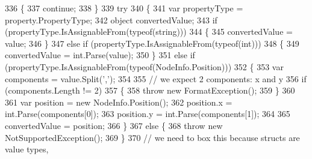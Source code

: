 \begin{DoxyCode}
336                                     \{
337                                         \textcolor{keywordflow}{continue};
338                                     \}
339                                     \textcolor{keywordflow}{try}
340                                     \{
341                                         var propertyType = property.PropertyType;
342                                         \textcolor{keywordtype}{object} convertedValue;
343                                         \textcolor{keywordflow}{if} (propertyType.IsAssignableFrom(typeof(\textcolor{keywordtype}{string})))
344                                         \{
345                                             convertedValue = value;
346                                         \}
347                                         \textcolor{keywordflow}{else} \textcolor{keywordflow}{if} (propertyType.IsAssignableFrom(typeof(\textcolor{keywordtype}{int})))
348                                         \{
349                                             convertedValue = int.Parse(value);
350                                         \}
351                                         \textcolor{keywordflow}{else} \textcolor{keywordflow}{if} (propertyType.IsAssignableFrom(typeof(NodeInfo.Position)))
352                                         \{
353                                             var components = value.Split(\textcolor{charliteral}{','});
354 
355                                             \textcolor{comment}{// we expect 2 components: x and y}
356                                             \textcolor{keywordflow}{if} (components.Length != 2)
357                                             \{
358                                                 \textcolor{keywordflow}{throw} \textcolor{keyword}{new} FormatException();
359                                             \}
360 
361                                             var position = \textcolor{keyword}{new} NodeInfo.Position();
362                                             position.x = int.Parse(components[0]);
363                                             position.y = int.Parse(components[1]);
364 
365                                             convertedValue = position;
366                                         \}
367                                         \textcolor{keywordflow}{else} \{
368                                             \textcolor{keywordflow}{throw} \textcolor{keyword}{new} NotSupportedException();
369                                         \}
370                                         \textcolor{comment}{// we need to box this because structs are value types,}

\end{DoxyCode}
